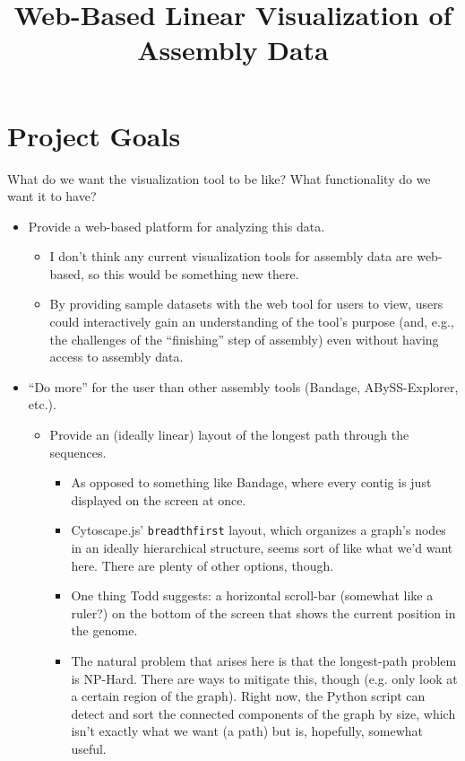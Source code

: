 \documentclass[12pt]{article}
\begin{document}
\title{Web-Based Linear Visualization of Assembly Data}
\maketitle

\section{Project Goals}

What do we want the visualization tool to be like? What functionality do
we want it to have?

\begin{itemize}
\item Provide a web-based platform for analyzing this data.
	\begin{itemize}
	\item I don't think any current visualization tools for
		assembly data are web-based,
		so this would be something new there.
	\item By providing sample datasets with the web tool for users to
		view, users could interactively gain an understanding of
		the tool's purpose (and, e.g., the challenges of the
		``finishing'' step of assembly) even without having
		access to assembly data.
	\end{itemize}

\item ``Do more'' for the user than other assembly tools (Bandage,
	ABySS-Explorer, etc.).
	\begin{itemize}
	\item Provide an (ideally linear) layout of the longest path
		through the sequences.
		\begin{itemize}
		\item As opposed to something like Bandage, where every
			contig is just displayed on the screen at once.
		\item Cytoscape.js' \texttt{breadthfirst} layout, which
			organizes a graph's nodes in an ideally
			hierarchical structure, seems sort of like what
			we'd want here. There are plenty of other options,
			though.
		\item One thing Todd suggests: a horizontal scroll-bar
			(somewhat like a ruler?) on the bottom of the
			screen that shows the current position in the
			genome.
		\item The natural problem that arises here is that the
			longest-path problem is NP-Hard. There are ways
			to mitigate this, though (e.g. only look at a
			certain region of the graph). Right now, the
			Python script can detect and sort the connected
			components of the graph by size, which isn't
			exactly what we want (a path) but is, hopefully,
			somewhat useful.
		\end{itemize}
	\end{itemize}
	

\end{itemize}
\end{document}
